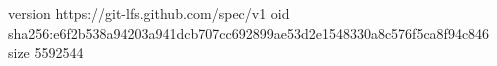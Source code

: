 version https://git-lfs.github.com/spec/v1
oid sha256:e6f2b538a94203a941dcb707cc692899ae53d2e1548330a8c576f5ca8f94c846
size 5592544
